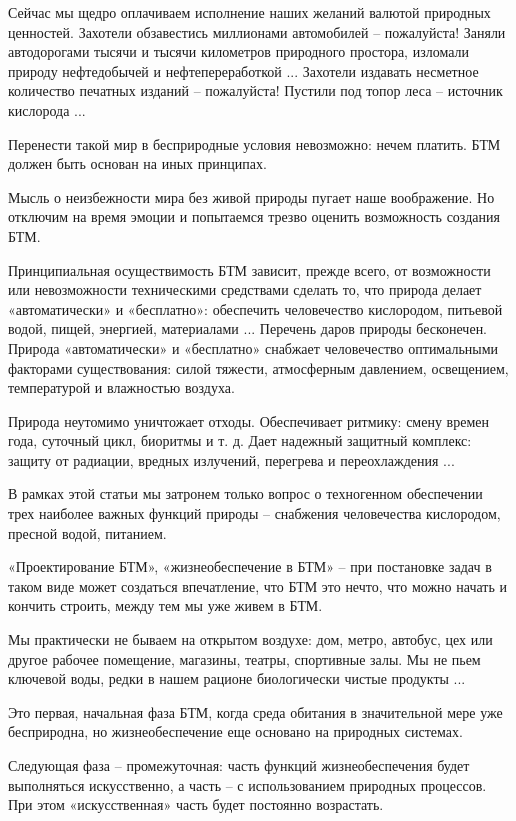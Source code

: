 \documentclass[11pt,a4paper]{article}
\begin{document}
Сейчас мы щедро оплачиваем исполнение наших желаний валютой природных
ценностей. Захотели обзавестись миллионами автомобилей -- пожалуйста! Заняли
автодорогами тысячи и тысячи километров природного простора, изломали природу
нефтедобычей и нефтепереработкой ... Захотели издавать несметное количество
печатных изданий -- пожалуйста! Пустили под топор леса -- источник кислорода
...

Перенести такой мир в бесприродные условия невозможно: нечем платить. БТМ
должен быть основан на иных принципах.

Мысль о неизбежности мира без живой природы пугает наше воображение. Но
отключим на время эмоции и попытаемся трезво оценить возможность создания БТМ.

Принципиальная осуществимость БТМ зависит, прежде всего, от возможности или
невозможности техническими средствами сделать то, что природа делает
«автоматически» и «бесплатно»: обеспечить человечество кислородом, питьевой
водой, пищей, энергией, материалами ... Перечень даров природы бесконечен.
Природа «автоматически» и «бесплатно» снабжает человечество оптимальными
факторами существования: силой тяжести, атмосферным давлением, освещением,
температурой и влажностью воздуха.

Природа неутомимо уничтожает отходы. Обеспечивает ритмику: смену времен года,
суточный цикл, биоритмы и т. д. Дает надежный защитный комплекс: защиту от
радиации, вредных излучений, перегрева и переохлаждения ...

В рамках этой статьи мы затронем только вопрос о техногенном обеспечении трех
наиболее важных функций природы -- снабжения человечества кислородом, пресной
водой, питанием.

«Проектирование БТМ», «жизнеобеспечение в БТМ» -- при постановке задач в таком
виде может создаться впечатление, что БТМ это нечто, что можно начать и
кончить строить, между тем мы уже живем в БТМ.

Мы практически не бываем на открытом воздухе: дом, метро, автобус, цех или
другое рабочее помещение, магазины, театры, спортивные залы. Мы не пьем
ключевой воды, редки в нашем рационе биологически чистые продукты ...

Это первая, начальная фаза БТМ, когда среда обитания в значительной мере уже
бесприродна, но жизнеобеспечение еще основано на природных системах.

Следующая фаза -- промежуточная: часть функций жизнеобеспечения будет
выполняться искусственно, а часть -- с использованием природных процессов. При
этом «искусственная» часть будет постоянно возрастать.
\end{document}
